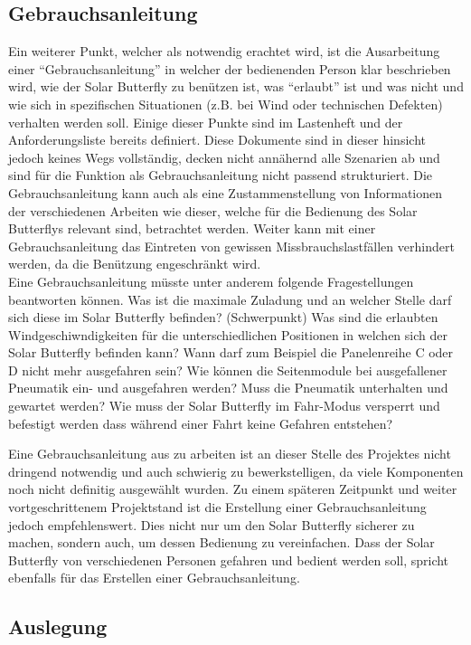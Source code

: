 \subsection{Gebrauchsanleitung}
Ein weiterer Punkt, welcher als notwendig erachtet wird, ist die Ausarbeitung einer ``Gebrauchsanleitung'' in welcher der bedienenden Person klar beschrieben wird, wie der Solar Butterfly zu benützen ist, was ``erlaubt'' ist und was nicht und wie sich in spezifischen Situationen (z.B. bei Wind oder technischen Defekten) verhalten werden soll. Einige dieser Punkte sind im Lastenheft und der Anforderungsliste bereits definiert. Diese Dokumente sind in dieser hinsicht jedoch keines Wegs vollständig, decken nicht annähernd alle Szenarien ab und sind für die Funktion als Gebrauchsanleitung nicht passend strukturiert. Die Gebrauchsanleitung kann auch als eine Zustammenstellung von Informationen der verschiedenen Arbeiten wie dieser, welche für die Bedienung des Solar Butterflys relevant sind, betrachtet werden. Weiter kann mit einer Gebrauchsanleitung das Eintreten von gewissen Missbrauchslastfällen verhindert werden, da die Benützung engeschränkt wird.\\
Eine Gebrauchsanleitung müsste unter anderem folgende Fragestellungen beantworten können.
Was ist die maximale Zuladung und an welcher Stelle darf sich diese im Solar Butterfly befinden? (Schwerpunkt)
Was sind die erlaubten Windgeschiwndigkeiten für die unterschiedlichen Positionen in welchen sich der Solar Butterfly befinden kann? Wann darf zum Beispiel die Panelenreihe C oder D nicht mehr ausgefahren sein?
Wie können die Seitenmodule bei ausgefallener Pneumatik ein- und ausgefahren werden? Muss die Pneumatik unterhalten und gewartet werden?
Wie muss der Solar Butterfly im Fahr-Modus versperrt und befestigt werden dass während einer Fahrt keine Gefahren entstehen?

Eine Gebrauchsanleitung aus zu arbeiten ist an dieser Stelle des Projektes nicht dringend notwendig und auch schwierig zu bewerkstelligen, da viele Komponenten noch nicht definitig ausgewählt wurden. Zu einem späteren Zeitpunkt und weiter vortgeschrittenem Projektstand ist die Erstellung einer Gebrauchsanleitung jedoch empfehlenswert. Dies nicht nur um den Solar Butterfly sicherer zu machen, sondern auch, um dessen Bedienung zu vereinfachen. Dass der Solar Butterfly von verschiedenen Personen gefahren und bedient werden soll, spricht ebenfalls für das Erstellen einer Gebrauchsanleitung.

\subsection{Auslegung}

